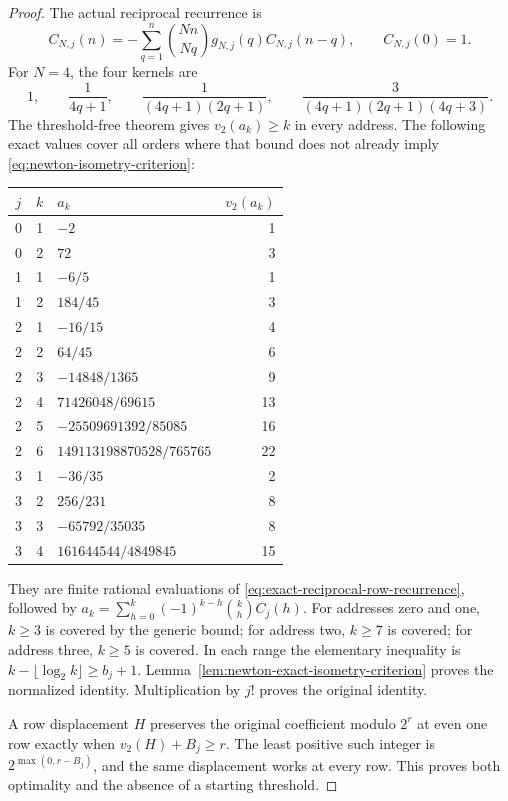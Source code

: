 \begin{proof}
The actual reciprocal recurrence is
\begin{equation}
 C_{N,j}(n)=-\sum_{q=1}^n\binom{Nn}{Nq}
           g_{N,j}(q)C_{N,j}(n-q),\qquad C_{N,j}(0)=1.
 \label{eq:exact-reciprocal-row-recurrence}
\end{equation}
For $N=4$, the four kernels are
\[
 1,\qquad\frac1{4q+1},\qquad
 \frac1{(4q+1)(2q+1)},\qquad
 \frac3{(4q+1)(2q+1)(4q+3)}.
\]
The threshold-free theorem gives $v_2(a_k)\geq k$ in every address.
The following exact values cover all orders where that bound does not
already imply \eqref{eq:newton-isometry-criterion}:
\begin{center}
\begin{tabular}{c r l r}
$j$&$k$&$a_k$&$v_2(a_k)$\\\hline
0&1&$-2$&1\\
0&2&$72$&3\\
1&1&$-6/5$&1\\
1&2&$184/45$&3\\
2&1&$-16/15$&4\\
2&2&$64/45$&6\\
2&3&$-14848/1365$&9\\
2&4&$71426048/69615$&13\\
2&5&$-25509691392/85085$&16\\
2&6&$149113198870528/765765$&22\\
3&1&$-36/35$&2\\
3&2&$256/231$&8\\
3&3&$-65792/35035$&8\\
3&4&$161644544/4849845$&15
\end{tabular}
\end{center}
They are finite rational evaluations of
\eqref{eq:exact-reciprocal-row-recurrence}, followed by
$a_k=\sum_{h=0}^k(-1)^{k-h}\binom kh C_j(h)$.
For addresses zero and one, $k\geq3$ is covered by the generic bound;
for address two, $k\geq7$ is covered; for address three, $k\geq5$ is
covered. In each range the elementary inequality is
$k-\lfloor\log_2k\rfloor\geq b_j+1$.
Lemma~\ref{lem:newton-exact-isometry-criterion} proves the normalized
identity. Multiplication by $j!$ proves the original identity.

A row displacement $H$ preserves the original coefficient modulo
$2^r$ at even one row exactly when $v_2(H)+B_j\geq r$.
The least positive such integer is
$2^{\max(0,r-B_j)}$, and the same displacement works at every row.
This proves both optimality and the absence of a starting threshold.
\end{proof}

